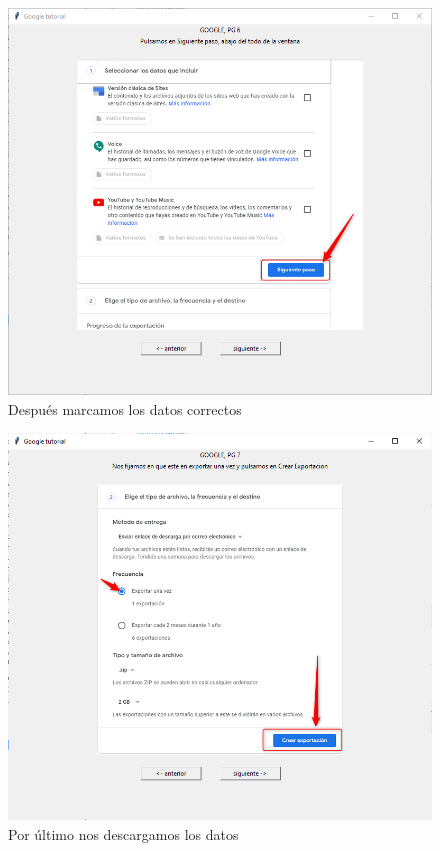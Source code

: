 \begin{figure}
	\begin{center}
		\includegraphics[scale=0.5]{Imagenes/Fuentes/TutorialDescargaG4.png} \caption{Después marcamos los datos correctos}
		\label{TutorialDescargaG4}
	\end{center}
\end{figure}
\begin{figure}
	\begin{center}
		\includegraphics[scale=0.5]{Imagenes/Fuentes/TutorialDescargaG5.png} \caption{Por último nos descargamos los datos}
		\label{TutorialDescargaG5}
	\end{center}
\end{figure}

